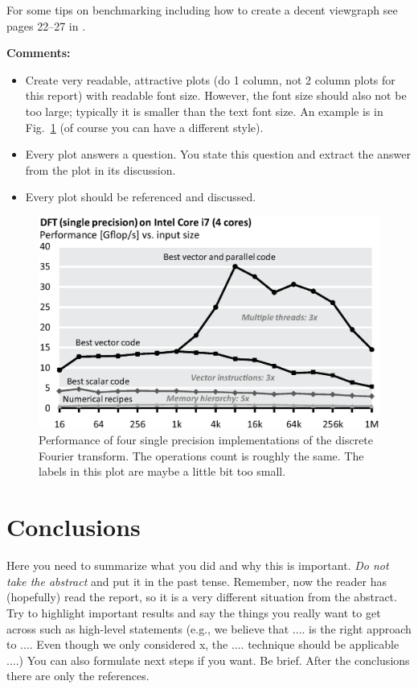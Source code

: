 \documentclass[letterpaper]{article}
\begin{document}
For some tips on benchmarking including how to create a decent viewgraph see pages 22--27 in \cite{Pueschel:10}.

{\bf Comments:}
\begin{itemize}
\item Create very readable, attractive plots (do 1 column, not 2 column plots
for this report) with readable font size. However, the font size should also not be too large; typically it is smaller than the text font size.
An example is in Fig.~\ref{fftperf} (of course you can have a different style).
\item Every plot answers a question. You state this question and extract the
answer from the plot in its discussion.
\item Every plot should be referenced and discussed.
\end{itemize}

\begin{figure}\centering
  \includegraphics[scale=0.33]{dft-performance.eps}
  \caption{Performance of four single precision implementations of the
  discrete Fourier transform. The operations count is roughly the
  same. The labels in this plot are maybe a little bit too small.\label{fftperf}}
\end{figure}

\section{Conclusions}

Here you need to summarize what you did and why this is
important. {\em Do not take the abstract} and put it in the past
tense. Remember, now the reader has (hopefully) read the report, so it
is a very different situation from the abstract. Try to highlight
important results and say the things you really want to get across
such as high-level statements (e.g., we believe that .... is the right
approach to .... Even though we only considered x, the
.... technique should be applicable ....) You can also formulate next
steps if you want. Be brief. After the conclusions there are only the references.
\end{document}
